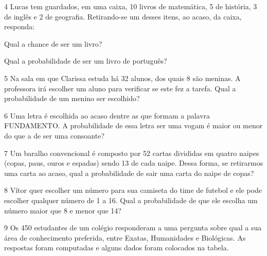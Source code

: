 
\num{4} Lucas tem guardados, em uma caixa, 10 livros de matemática, 5 de história, 3 de inglês e
2 de geografia. Retirando-se um desses itens, ao acaso, da caixa,
responda:

\begin{escolha}
\item Qual a chance de ser um livro?

\item  Qual a probabilidade de ser um livro de português?
\end{escolha}

\num{5} Na sala em que Clarissa estuda há 32 alunos, dos quais 8 são meninas. A
professora irá escolher um aluno para verificar se este fez a tarefa.
Qual a probabilidade de um menino ser escolhido?


\num{6} Uma letra é escolhida ao acaso dentre as que formam a palavra
FUNDAMENTO. A probabilidade de essa letra ser uma vogam é maior ou menor do que a de ser uma consoante?


\num{7} Um baralho convencional é composto por 52 cartas divididas em quatro
naipes (copas, paus, ouros e espadas) sendo 13 de cada naipe. Dessa
forma, se retirarmos uma carta ao acaso, qual a probabilidade de sair
uma carta do naipe de copas?

\num{8} Vítor quer escolher um número para sua camiseta do time de futebol e ele
pode escolher qualquer número de 1 a 16. Qual a probabilidade de que ele
escolha um número maior que 8 e menor que 14?

\num{9} Os 450 estudantes de um colégio responderam a uma pergunta sobre qual a
sua área de conhecimento preferida, entre Exatas, Humanidades e
Biológicas. As respostas foram computadas e alguns dados foram colocados
na tabela.

